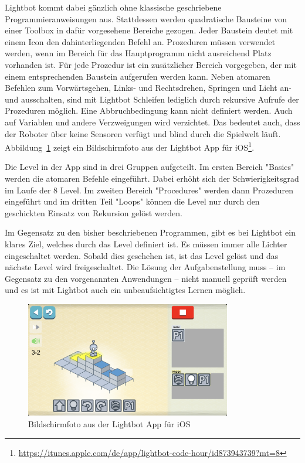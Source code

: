 Lightbot kommt dabei gänzlich ohne klassische geschriebene Programmieranweisungen aus. Stattdessen werden quadratische Bausteine von einer Toolbox in dafür vorgesehene Bereiche gezogen. Jeder Baustein deutet mit einem Icon den dahinterliegenden Befehl an. Prozeduren müssen verwendet werden, wenn im Bereich für das Hauptprogramm nicht ausreichend Platz vorhanden ist. Für jede Prozedur ist ein zusätzlicher Bereich vorgegeben, der mit einem entsprechenden Baustein aufgerufen werden kann. Neben atomaren Befehlen zum Vorwärtsgehen, Links- und Rechtsdrehen, Springen und Licht an- und ausschalten, sind mit Lightbot Schleifen lediglich durch rekursive Aufrufe der Prozeduren möglich. Eine Abbruchbedingung kann nicht definiert werden. Auch auf Variablen und andere Verzweigungen wird verzichtet. Das bedeutet auch, dass der Roboter über keine Sensoren verfügt und blind durch die Spielwelt läuft. Abbildung~\ref{fig:related:lightbot:screenshot} zeigt ein Bildschirmfoto aus der Lightbot App für iOS\footnote{\url{https://itunes.apple.com/de/app/lightbot-code-hour/id873943739?mt=8}}.

Die Level in der App sind in drei Gruppen aufgeteilt. Im ersten Bereich "Basics" werden die atomaren Befehle eingeführt. Dabei erhöht sich der Schwierigkeitsgrad im Laufe der 8 Level. Im zweiten Bereich "Procedures" werden dann Prozeduren eingeführt und im dritten Teil "Loops" können die Level nur durch den geschickten Einsatz von Rekursion gelöst werden.

Im Gegensatz zu den bisher beschriebenen Programmen, gibt es bei Lightbot ein klares Ziel, welches durch das Level definiert ist. Es müssen immer alle Lichter eingeschaltet werden. Sobald dies geschehen ist, ist das Level gelöst und das nächste Level wird freigeschaltet. Die Lösung der Aufgabenstellung muss -- im Gegensatz zu den vorgenannten Anwendungen -- nicht manuell geprüft werden und es ist mit Lightbot auch ein unbeaufsichtigtes Lernen möglich.

\begin{figure}
    \centering
    \includegraphics[width=0.8\textwidth]{gfx/related-lightbot-screenshot.png}
    \caption{Bildschirmfoto aus der Lightbot App für iOS}
    \label{fig:related:lightbot:screenshot}
\end{figure}
